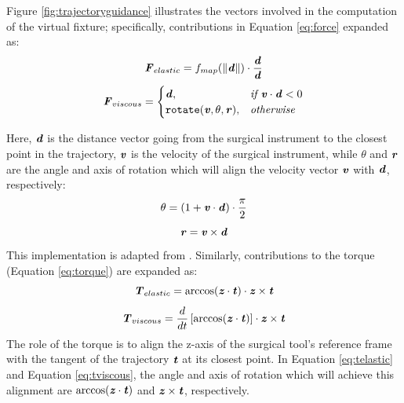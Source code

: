 \documentclass[../main.tex]{subfiles}
\begin{document}
Figure \ref{fig:trajectoryguidance} illustrates the vectors involved in the computation of the virtual fixture; specifically, contributions in Equation \ref{eq:force} expanded as:
\begin{equation}
    \textbf{\textit{F}}_{elastic} = f_{map}(\|\textbf{\textit{d}}\|)\cdot\frac{\textbf{\textit{d}}}{\textbf{\textit{d}}}
\end{equation} 
\begin{equation}
    \textbf{\textit{F}}_{viscous} = 
    \begin{cases} 
        \textbf{\textit{d}}, & \textit{if         } \textbf{\textit{v}}\cdot\textbf{\textit{d}}<0 \\
         \texttt{rotate}(\textbf{\textit{v}},\theta,\textbf{\textit{r}}), & \textit{otherwise}
    \end{cases}
\end{equation} 

Here, $\textbf{\textit{d}}$ is the distance vector going from the surgical instrument to the closest point in the trajectory, $\textbf{\textit{v}}$ is the velocity of the surgical instrument, while $\theta$ and $\textbf{\textit{r}}$ are the angle and axis of rotation which will align the velocity vector $\textbf{\textit{v}}$ with $\textbf{\textit{d}}$, respectively:
\begin{equation}
    \theta = (1+\textbf{\textit{v}}\cdot\textbf{\textit{d}})\cdot\frac{\pi}{2}
\end{equation}
\begin{equation}
    \textbf{\textit{r}} = \textbf{\textit{v}}\times\textbf{\textit{d}}
\end{equation}
This implementation is adapted from \cite{Enayati2016}. Similarly, contributions to the torque (Equation \ref{eq:torque}) are expanded as: 
\begin{equation}
    \textbf{\textit{T}}_{elastic} = \arccos (\textbf{\textit{z}}\cdot\textbf{\textit{t}} ) \cdot \textbf{\textit{z}} \times \textbf{\textit{t}}
    \label{eq:telastic}
\end{equation}
\begin{equation}
    \textbf{\textit{T}}_{viscous} = \frac{d}{dt} \left[ \arccos (\textbf{\textit{z}}\cdot\textbf{\textit{t}} ) \right] \cdot \textbf{\textit{z}} \times \textbf{\textit{t}}
    \label{eq:tviscous}
\end{equation}
The role of the torque is to align the z-axis of the surgical tool's reference frame with the tangent of the trajectory $\textbf{\textit{t}}$ at its closest point. In Equation \ref{eq:telastic} and Equation \ref{eq:tviscous}, the angle and axis of rotation which will achieve this alignment are $\arccos(\textbf{\textit{z}}\cdot\textbf{\textit{t}})$ and $\textbf{\textit{z}} \times \textbf{\textit{t}}$, respectively.
\end{document}
